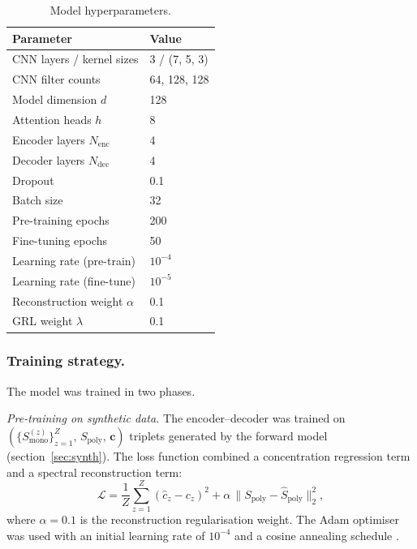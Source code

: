 \documentclass{iopjournal}
\begin{document}
\begin{table}[htbp]
\centering
\caption{Model hyperparameters.}
\label{tab:hyper}
\begin{tabular}{ll}
\toprule
Parameter & Value \\
\midrule
CNN layers / kernel sizes       & 3 / (7, 5, 3) \\
CNN filter counts               & 64, 128, 128 \\
Model dimension $d$             & 128 \\
Attention heads $h$             & 8 \\
Encoder layers $N_{\mathrm{enc}}$ & 4 \\
Decoder layers $N_{\mathrm{dec}}$ & 4 \\
Dropout                         & 0.1 \\
Batch size                      & 32 \\
Pre-training epochs             & 200 \\
Fine-tuning epochs              & 50 \\
Learning rate (pre-train)       & $10^{-4}$ \\
Learning rate (fine-tune)       & $10^{-5}$ \\
Reconstruction weight $\alpha$  & 0.1 \\
GRL weight $\lambda$            & 0.1 \\
\bottomrule
\end{tabular}
\end{table}

\subsubsection{Training strategy.}

The model was trained in two phases.

\emph{Pre-training on synthetic data.}
The encoder--decoder was trained on $(\{S_{\mathrm{mono}}^{(z)}\}_{z=1}^{Z},\,S_{\mathrm{poly}},\,\mathbf{c})$ triplets generated by the forward model (section~\ref{sec:synth}).
The loss function combined a concentration regression term and a spectral reconstruction term:
\begin{equation} \label{eq:loss}
\mathcal{L} = \frac{1}{Z}\sum_{z=1}^{Z}(\hat{c}_z - c_z)^2 + \alpha\,\|S_{\mathrm{poly}} - \hat{S}_{\mathrm{poly}}\|_2^2,
\end{equation}
where $\alpha = 0.1$ is the reconstruction regularisation weight.
The Adam optimiser \cite{kingma_adam_2015} was used with an initial learning rate of $10^{-4}$ and a cosine annealing schedule \cite{loshchilov_sgdr_2017}.
\end{document}
